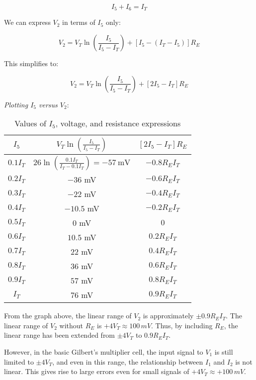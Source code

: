 \documentclass[a4paper,9pt,twoside,openany,twocolumn]{memoir}
\begin{document}
\begin{equation}
I_5 + I_6 = I_T \tag{2}
\end{equation}

We can express \( V_2 \) in terms of \( I_5 \) only:

\begin{equation}
V_2 = V_T \ln \left( \frac{I_5}{I_5 - I_T} \right) + \left[ I_5 - \left( I_T - I_5 \right) \right] R_E \tag{3}
\end{equation}

This simplifies to:

\begin{equation}
V_2 = V_T \ln \left( \frac{I_5}{I_5 - I_T} \right) + [2I_5 - I_T] R_E \tag{4}
\end{equation}

\textit{Plotting \( I_5 \) versus \( V_2 \)}:
\begin{table}[h!]
\centering
\begin{tabular}{|c|c|c|}
\hline
$I_5$ & $V_T \ln \left( \frac{I_5}{I_5 - I_T} \right)$ & $\left[ 2I_5 - I_T \right] R_E$ \\
\hline
$0.1 I_T$ & $26 \ln \left( \frac{0.1I_T}{I_T - 0.1I_T} \right) = -57 \ \text{mV}$ & $-0.8 R_E I_T$ \\
$0.2 I_T$ & $-36$ mV & $-0.6 R_E I_T$ \\
$0.3 I_T$ & $-22$ mV & $-0.4 R_E I_T$ \\
$0.4 I_T$ & $-10.5$ mV & $-0.2 R_E I_T$ \\
$0.5 I_T$ & $0$ mV & $0$ \\
$0.6 I_T$ & $10.5$ mV & $0.2 R_E I_T$ \\
$0.7 I_T$ & $22$ mV & $0.4 R_E I_T$ \\
$0.8 I_T$ & $36$ mV & $0.6 R_E I_T$ \\
$0.9 I_T$ & $57$ mV & $0.8 R_E I_T$ \\
$I_T$     & $76$ mV & $0.9 R_E I_T$ \\
\hline
\end{tabular}
\caption{Values of $I_5$, voltage, and resistance expressions}
\label{table:values}
\end{table}

From the graph above, the linear range of \( V_2 \) is approximately \( \pm 0.9 R_E I_T \). The linear range of \( V_2 \) without \( R_E \) is \( +4V_T \approx 100\,mV \). Thus, by including \( R_E \), the linear range has been extended from \( \pm 4V_T \) to \( 0.9 R_E I_T \).

However, in the basic Gilbert’s multiplier cell, the input signal to \( V_1 \) is still limited to \( \pm 4V_T \), and even in this range, the relationship between \( I_1 \) and \( I_2 \) is not linear. This gives rise to large errors even for small signals of \( +4V_T \approx +100\,mV \).
\end{document}
